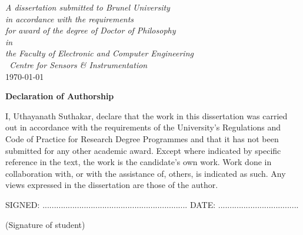 \documentclass[oneside, a4paper, 11pt, ]{report}
\begin{document}
\begin{titlepage}
\begin{center}
\large \textit{ A dissertation submitted to Brunel University\\ in accordance with the requirements\\ for award of the degree of Doctor of Philosophy}\\[0.3cm] 
\textit{in}\\[0.4cm]
\textit{the Faculty of Electronic and Computer Engineering\\\ Centre for Sensors \& Instrumentation} \\

\vspace*{10mm}
{\large \today}\\[4cm]

\end{center}

\end{titlepage}

\pagestyle{empty}


\newpage

\begin{declaration}
\begin{center}
 \begin{large}
\textbf{Declaration of Authorship}
\end{large}
\end{center}

\noindent I, Uthayanath Suthakar, declare that the work in this dissertation was carried out in accordance with the requirements of the University's Regulations and Code of Practice for Research Degree Programmes and that it has not been submitted for any other academic award. Except where indicated by specific reference in the text, the work is the candidate's own work. Work done in collaboration with, or with the assistance of, others, is indicated as such. Any views expressed in the dissertation are those of the author.\\

\begin{center}
SIGNED: $...............................................................$  DATE: $...................................$

(Signature of student)

\vspace{12pt}
\end{center}
\null\vfill
\end{declaration}
\end{document}
